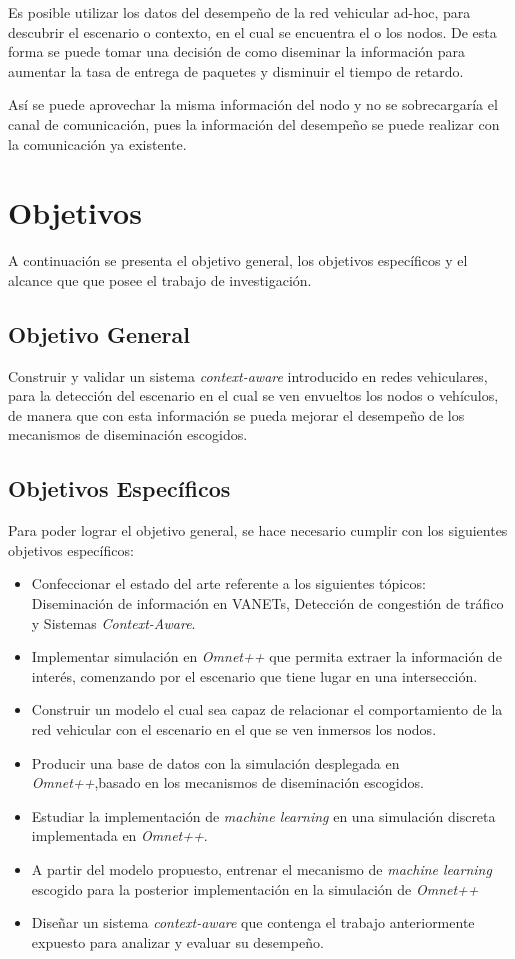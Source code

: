 Es posible utilizar los datos del desempeño de la red vehicular ad-hoc, para descubrir el escenario o contexto, en el cual se encuentra el o los nodos. De esta forma se puede tomar una decisión de como diseminar la información para aumentar la tasa de entrega de paquetes y disminuir el tiempo de retardo.

Así se puede aprovechar la misma información del nodo y no se sobrecargaría el canal de comunicación, pues la información del desempeño se puede realizar con la comunicación ya existente.

\section{Objetivos}
A continuación se presenta el objetivo general, los objetivos específicos y el alcance que que posee el trabajo de investigación.

\subsection{Objetivo General}

Construir y validar un sistema \textit{context-aware} introducido en redes vehiculares, para la detección del escenario en el cual se ven envueltos los nodos o vehículos, de manera que con esta información se pueda mejorar el desempeño de los mecanismos de diseminación escogidos.


\subsection{Objetivos Específicos}
Para poder lograr el objetivo general, se hace necesario cumplir con los siguientes objetivos específicos:

\begin{itemize}
	\item Confeccionar el estado del arte referente a los siguientes tópicos: Diseminación de información en VANETs, Detección de congestión de tráfico y Sistemas \textit{Context-Aware}.
    \item Implementar simulación en \textit{Omnet++} que permita extraer la información de interés, comenzando por el escenario que tiene lugar en una intersección.
    \item Construir un modelo el cual sea capaz de relacionar el comportamiento de la red vehicular con el escenario en el que se ven inmersos los nodos. 
    \item Producir una base de datos con la simulación desplegada en \textit{Omnet++},basado en los mecanismos de diseminación escogidos.
    \item Estudiar la implementación de \textit{machine learning} en una simulación discreta implementada en \textit{Omnet++}.
    \item A partir del modelo propuesto, entrenar el mecanismo de \textit{machine learning} escogido para la posterior implementación en la simulación de \textit{Omnet++}  
    \item Diseñar un sistema \textit{context-aware} que contenga el trabajo anteriormente expuesto para analizar y evaluar su desempeño.
\end{itemize}


